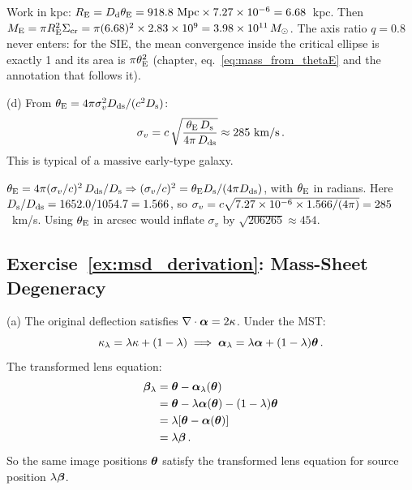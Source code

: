 \begin{derivation}
Work in kpc: $R_{\mathrm{E}} = D_{\mathrm{d}}\theta_{\mathrm{E}} = 918.8~\mathrm{Mpc}\times 7.27\times10^{-6} =
6.68$~kpc.  Then $M_{\mathrm{E}} = \pi R_{\mathrm{E}}^2\Sigma_{\mathrm{cr}} = \pi(6.68)^2\times
2.83\times10^{9} = 3.98\times10^{11}\,M_{\odot}$.  The axis ratio $q = 0.8$ never
enters: for the SIE, the mean convergence inside the critical ellipse is
exactly 1 and its area is $\pi\theta_{\mathrm{E}}^2$ (chapter,
eq.~\eqref{eq:mass_from_thetaE} and the annotation that follows it).
\end{derivation}

(d) From $\theta_{\mathrm{E}} = 4\pi\sigma_v^2D_{\mathrm{ds}}/(c^2D_{\mathrm{s}})$:
\begin{equation*}
    \sigma_v = c\,\sqrt{\frac{\theta_{\mathrm{E}}\,D_{\mathrm{s}}}{4\pi\,D_{\mathrm{ds}}}}
    \approx 285~\mathrm{km/s} \,.
\end{equation*}
This is typical of a massive early-type galaxy. \checkmark

\begin{derivation}
$\theta_{\mathrm{E}} = 4\pi(\sigma_v/c)^2\,D_{\mathrm{ds}}/D_{\mathrm{s}} \Rightarrow
(\sigma_v/c)^2 = \theta_{\mathrm{E}}D_{\mathrm{s}}/(4\pi D_{\mathrm{ds}})$, with $\theta_{\mathrm{E}}$ in radians.
Here $D_{\mathrm{s}}/D_{\mathrm{ds}} = 1652.0/1054.7 = 1.566$, so
$\sigma_v = c\sqrt{7.27\times10^{-6}\times1.566/(4\pi)} = 285$~km/s.
Using $\theta_{\mathrm{E}}$ in arcsec would inflate $\sigma_v$ by
$\sqrt{206265} \approx 454$.
\end{derivation}

\subsection*{Exercise~\ref{ex:msd_derivation}: Mass-Sheet Degeneracy}

(a) The original deflection satisfies
$\nabla \cdot \boldsymbol{\alpha} = 2\kappa$.  Under the MST:
\begin{equation*}
    \kappa_\lambda = \lambda\kappa + (1-\lambda)
    \implies
    \boldsymbol{\alpha}_\lambda = \lambda\boldsymbol{\alpha} + (1-\lambda)\boldsymbol{\theta} \,.
\end{equation*}
The transformed lens equation:
\begin{align*}
    \boldsymbol{\beta}_\lambda
    &= \boldsymbol{\theta} - \boldsymbol{\alpha}_\lambda(\boldsymbol{\theta}) \\
    &= \boldsymbol{\theta} - \lambda\boldsymbol{\alpha}(\boldsymbol{\theta})
       - (1-\lambda)\boldsymbol{\theta} \\
    &= \lambda[\boldsymbol{\theta} - \boldsymbol{\alpha}(\boldsymbol{\theta})] \\
    &= \lambda\boldsymbol{\beta} \,.
\end{align*}
So the same image positions $\boldsymbol{\theta}$ satisfy the transformed lens
equation for source position $\lambda\boldsymbol{\beta}$. \checkmark

